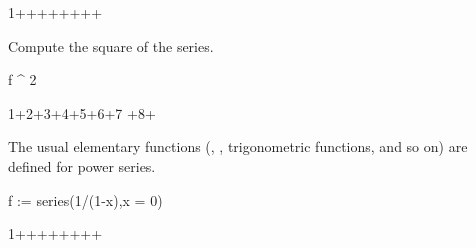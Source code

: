 {{{{{{{{\begin{xtc}
\begin{TeXOutput}
\begin{fricasmath}{4}
1++++++++%
%
\end{fricasmath}
\end{TeXOutput}
\end{xtc}
\begin{xtc}
\begin{xtccomment}
Compute the square of the series.
\end{xtccomment}
\begin{spadsrc}
f ^ 2 
\end{spadsrc}
\begin{TeXOutput}
\begin{fricasmath}{5}
1+2\TIMES {}+3\TIMES {}+4\TIMES {}+5\TIMES {}+6\TIMES {}+7\TIMES %
+8\TIMES {}+%
\end{fricasmath}
\end{TeXOutput}
\end{xtc}
\begin{xtc}
\begin{xtccomment}
The usual elementary functions
(, , trigonometric functions, and so on)
are defined for power series.
\end{xtccomment}
\begin{spadsrc}
f := series(1/(1-x),x = 0) 
\end{spadsrc}
\begin{TeXOutput}
\begin{fricasmath}{6}
1++++++++%
%
\end{fricasmath}
\end{TeXOutput}
\end{xtc}
\begin{xtc}
\begin{xtccomment}
\end{xtccomment}
\begin{spadsrc}

\end{spadsrc}
\end{xtc}}}}}}}}}
